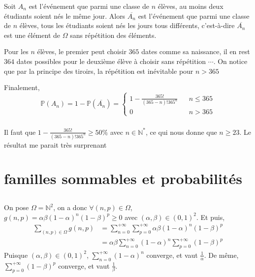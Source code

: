 \documentclass[a4paper,12pt]{book}
\begin{document}
Soit $A_n$ est l'événement que parmi une classe de $n$ élèves, au moins deux étudiants soient nés le même jour.
Alors $\overline{A_n}$ est l'événement que parmi une classe de $n$ élèves, tous les étudiants soient nés les jours tous différents, 
c'est-à-dire $\overline{A_n}$ est une élément de $\Omega$ sans répétition des éléments.

Pour les $n$ élèves, le premier peut choisir $365$ dates comme sa naissance, il en rest $364$ dates possibles pour le deuxième élève à choisir 
sans répétition $\cdots$. On notice que par la principe des tiroirs, la répétition est inévitable pour $n>365$

Finalement,  
\begin{equation}  \nonumber
    \mathbb{P}(A_n)=1-\mathbb{P}(\overline{A_n})=\left\{  
                 \begin{array}{ccc}  
                    1-\frac{365!}{(365-n)!365^n} & & n \leq 365\\  
                 0 & & n > 365  
                 \end{array}  
    \right.  
\end{equation}
\subsubsection{}
Il faut que $1-\frac{365!}{(365-n)!365^n}\geq 50\%$ avec $n \in \mathbb{N}^*$, ce qui nous donne que $\boxed{n \geq 23}$.
Le résultat me parait très surprenant 
\section{familles sommables et probabilités}
\subsection{}
On pose $\Omega=\mathbb{N}^2$, on a donc $\forall (n,p) \in \Omega$, 
$g(n,p)=\alpha \beta (1-\alpha)^n (1-\beta)^p \geq 0$ avec $(\alpha,\beta) \in (0,1)^2$. 
Et puis, 
\begin{align*}
    \sum_{(n,p) \in \Omega}g(n,p)&=\sum_{n=0}^{+\infty}\sum_{p=0}^{+\infty}\alpha \beta (1-\alpha)^n (1-\beta)^p\\
                                 &=\alpha \beta \sum_{n=0}^{+\infty}(1-\alpha)^n\sum_{p=0}^{+\infty}(1-\beta)^p
\end{align*}
Puisque $(\alpha,\beta) \in (0,1)^2$, $\sum_{n=0}^{+\infty}(1-\alpha)^n$ converge, et vaut $\frac{1}{\alpha}$. De même, 
$\sum_{p=0}^{+\infty}(1-\beta)^p$ converge, et vaut $\frac{1}{\beta}$. 
\end{document}
